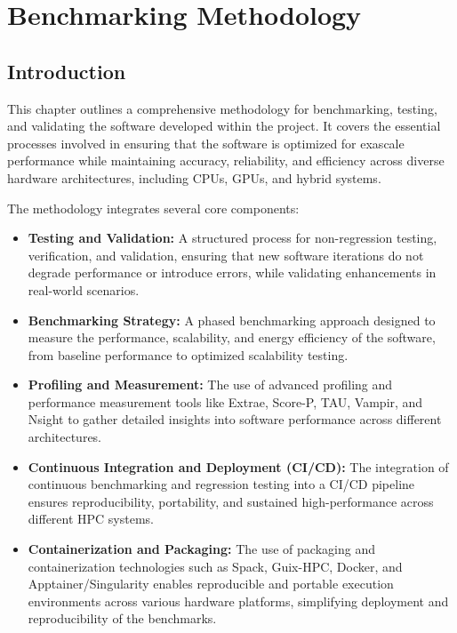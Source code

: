 
\chapter{Benchmarking Methodology}
\label{chap:comprehensive-methodology}

\section{Introduction}
\label{sec:comprehensive-methodology-intro}

This chapter outlines a comprehensive methodology for benchmarking, testing, and validating the software developed within the \exama project. It covers the essential processes involved in ensuring that the software is optimized for exascale performance while maintaining accuracy, reliability, and efficiency across diverse hardware architectures, including CPUs, GPUs, and hybrid systems.

The methodology integrates several core components:
\begin{itemize}
    \item \textbf{Testing and Validation:} A structured process for non-regression testing, verification, and validation, ensuring that new software iterations do not degrade performance or introduce errors, while validating enhancements in real-world scenarios.
    \item \textbf{Benchmarking Strategy:} A phased benchmarking approach designed to measure the performance, scalability, and energy efficiency of the software, from baseline performance to optimized scalability testing.
    \item \textbf{Profiling and Measurement:} The use of advanced profiling and performance measurement tools like Extrae, Score-P, TAU, Vampir, and Nsight to gather detailed insights into software performance across different architectures.
    \item \textbf{Continuous Integration and Deployment (CI/CD):} The integration of continuous benchmarking and regression testing into a CI/CD pipeline ensures reproducibility, portability, and sustained high-performance across different HPC systems.
    \item \textbf{Containerization and Packaging:} The use of packaging and containerization technologies such as Spack, Guix-HPC, Docker, and Apptainer/Singularity enables reproducible and portable execution environments across various hardware platforms, simplifying deployment and reproducibility of the benchmarks.
\end{itemize}

